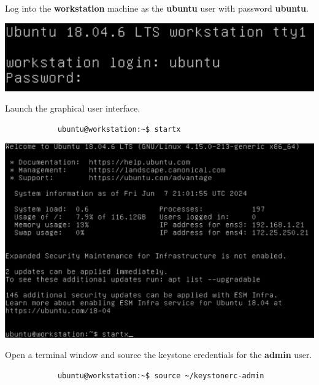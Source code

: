 \documentclass[letterpaper, 12pt]{article}
\begin{document}
\begin{enumerate}
    \begin{labstep}
        Log into the \textbf{workstation} machine as the \textbf{ubuntu} user with password \textbf{ubuntu}.

        \begin{center}
            \includegraphics[width=\linewidth]{images/part1/step1.png}
        \end{center}
    \end{labstep}

    \begin{labstep}
        Launch the graphical user interface.
        \begin{lstlisting}
            ubuntu@workstation:~$ startx
        \end{lstlisting}

        \begin{center}
            \includegraphics[width=\linewidth]{images/part1/step2.png}
        \end{center}
    \end{labstep}

    \begin{labstep}
        Open a terminal window and source the keystone credentials for the \textbf{admin} user.
        \begin{lstlisting}
            ubuntu@workstation:~$ source ~/keystonerc-admin
        \end{lstlisting}


\end{labstep}
\end{enumerate}
\end{document}
